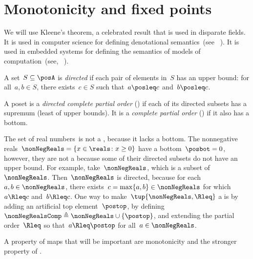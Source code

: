 
\section{Monotonicity and fixed points}
\label{sec:Monotonicity-and-fixed}

We will use Kleene's theorem, a celebrated result that is used in disparate fields.
It is used in computer science for defining denotational semantics~(see \eg~\cite{manes86}).
It is used in embedded systems for defining the semantics of models of computation~(see, \eg~\cite{lee10}).

\begin{definition}
    \label{def:directed-set}
    A set~$S\subseteq\posA$ is \emph{directed} if each pair of elements in~$S$ has an upper bound: for all~$a,b\in S$, there exists~$c\in S$ such that~$a\posleq c$ and~$b\posleq c$.
\end{definition}

\begin{definition}[Completeness]
    \label{def:cpo}A poset is a \emph{directed complete partial order} (\DCPO) if each of its directed subsets has a supremum (least of upper bounds).
    It is a \emph{complete partial order} (\CPO) if it also has a bottom.
\end{definition}

\begin{example}
    \label{exa:Rcomp}The set of real numbers~\reals is not a \CPO, because it lacks a bottom.
    The nonnegative reals~$\nonNegReals=\{x\in\reals \colon x\geq0\}$ have a bottom~$\posbot=0$, however, they are not a \DCPO because some of their directed subsets do not have an upper bound.
    For example, take~$\nonNegReals$, which is a subset of~$\nonNegReals$.
    Then~$\nonNegReals$ is directed, because for each~$a,b\in\nonNegReals$, there exists~$c=\max\{a,b\}\in\nonNegReals$ for which~$a\Rleq c$ and~$b\Rleq c$.
    One way to make~$\tup{ \nonNegReals,\Rleq} $ a \CPO is by adding an artificial top element~$\postop$, by defining~$\nonNegRealsComp\triangleq\nonNegReals\cup\{\postop\}$, and extending the partial order~$\Rleq$ so that~$a\Rleq\postop$ for all~$a\in\nonNegReals$.
\end{example}

A property of maps that will be important are monotonicity and the stronger property of \scottcontinuity.

